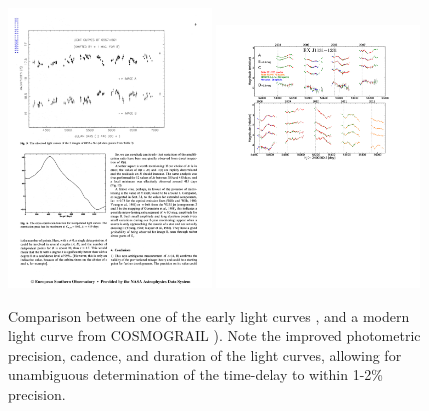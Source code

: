 \begin{figure}
\includegraphics[width=0.48\textwidth]{figures/Vanderriest89_fig5.pdf}
\includegraphics[width=0.48\textwidth]{figures/Tewes13-fig4.pdf}
\caption{Comparison between one of the early light curves \citep[left panel, from][]{Van89}, and a modern light curve from COSMOGRAIL \citep[right panel, from][]{Tew++13}). Note the improved photometric precision, cadence, and duration of the light curves, allowing for unambiguous determination of the time-delay to within 1-2\% precision.}
\label{fig:oldvsmoderndt}
\end{figure}

